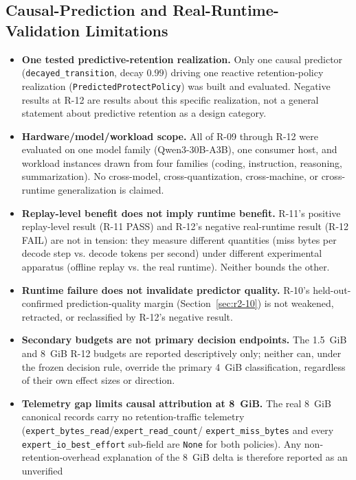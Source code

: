 \subsection*{Causal-Prediction and Real-Runtime-Validation Limitations}
\label{sec:iic-limitations}
\begin{itemize}
 \item \textbf{One tested predictive-retention realization.} Only one
   causal predictor (\texttt{decayed\_transition}, decay $0.99$) driving
   one reactive retention-policy realization (\texttt{PredictedProtectPolicy})
   was built and evaluated. Negative results at R-12 are results about
   this specific realization, not a general statement about predictive
   retention as a design category.
 \item \textbf{Hardware/model/workload scope.} All of R-09 through R-12
   were evaluated on one model family (Qwen3-30B-A3B), one consumer host,
   and workload instances drawn from four families (coding, instruction,
   reasoning, summarization). No cross-model, cross-quantization,
   cross-machine, or cross-runtime generalization is claimed.
 \item \textbf{Replay-level benefit does not imply runtime benefit.} R-11's
   positive replay-level result (R-11 PASS) and R-12's negative
   real-runtime result (R-12 FAIL) are not in tension: they
   measure different quantities (miss bytes per decode step vs. decode
   tokens per second) under different experimental apparatus (offline
   replay vs. the real runtime). Neither bounds the other.
 \item \textbf{Runtime failure does not invalidate predictor quality.} R-10's
   held-out-confirmed prediction-quality margin (Section~\ref{sec:r2-10})
   is not weakened, retracted, or reclassified by R-12's negative result.
 \item \textbf{Secondary budgets are not primary decision endpoints.} The
   1.5~GiB and 8~GiB R-12 budgets are reported descriptively only; neither
   can, under the frozen decision rule, override the primary 4~GiB
   classification, regardless of their own effect sizes or direction.
 \item \textbf{Telemetry gap limits causal attribution at 8~GiB.} The real
   8~GiB canonical records carry no retention-traffic telemetry
   (\texttt{expert\_bytes\_read}/\texttt{expert\_read\_count}/
   \texttt{expert\_miss\_bytes} and every \texttt{expert\_io\_best\_effort}
   sub-field are \texttt{None} for both policies). Any non-retention-overhead
   explanation of the 8~GiB delta is therefore reported as an unverified

\end{itemize}
